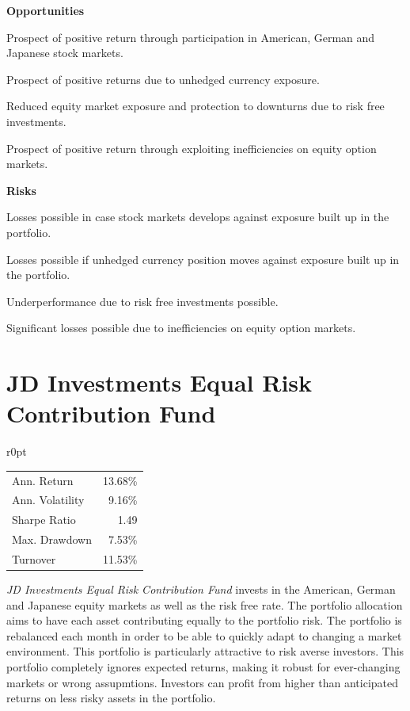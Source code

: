 \documentclass[11pt, parskip=full, DIV=14, headings=small, footsepline, footinclude=false, headsepline]{scrreprt}
\begin{document}
\begin{minipage}[t]{0.5\textwidth}
  \textbf{Opportunities}
\begin{sit}
    \item Prospect of positive return through participation in American, German and Japanese stock markets.
    \item Prospect of positive returns due to unhedged currency exposure.
    \item Reduced equity market exposure and protection to downturns due to risk free investments.
    \item Prospect of positive return through exploiting inefficiencies on equity option markets.
\end{sit}
\end{minipage}
\begin{minipage}[t]{0.5\textwidth}
  \textbf{Risks}
  \begin{sit}
    \item Losses possible in case stock markets develops against exposure built up in the portfolio.
    \item Losses possible if unhedged currency position moves against exposure built up in the portfolio.
    \item Underperformance due to risk free investments possible.
    \item Significant losses possible due to inefficiencies on equity option markets.%
  \end{sit}
\end{minipage}

\newpage\section{JD Investments Equal Risk Contribution Fund}
\begin{mywraptable}{r}{0pt}
\begin{tabular}{lr}
\toprule
Ann. Return & 13.68\%\\
Ann. Volatility & 9.16\%\\
Sharpe Ratio & 1.49 \\
Max. Drawdown & 7.53\% \\
Turnover & 11.53\%\\
\bottomrule
\end{tabular}
\end{mywraptable}
\textit{JD Investments Equal Risk Contribution Fund} invests in the American, German and Japanese equity markets as well as the risk free rate.
The portfolio allocation aims to have each asset contributing equally to the portfolio risk.
The portfolio is rebalanced each month in order to be able to quickly adapt to changing a market environment.
%
This portfolio is particularly attractive to risk averse investors.
This portfolio completely ignores expected returns, making it robust for ever-changing markets or wrong assupmtions.
Investors can profit from higher than anticipated returns on less risky assets in the portfolio.
 
\end{document}
